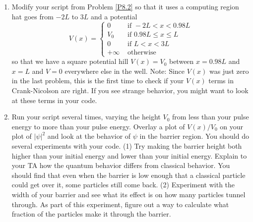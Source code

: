 \begin{problem}\label{P8.3}
\begin{enumerate}[label=(\alph*)]
	\item Modify your script from Problem \ref{P8.2} so that it uses a computing region hat goes from $-2L$ to $3L$ and a potential
\begin{equation}\label{eq:89}
V(x)= \begin{cases}0 & \text { if }-2 L<x<0.98 L \\ V_{0} & \text { if } 0.98 L \leq x \leq L \\ 0 & \text { if } L<x<3 L \\ +\infty & \text { otherwise }\end{cases}
\end{equation}
so that we have a square potential hill $V(x) = V_0$ between $x = 0.98L$ and $x = L$ and $V = 0$ everywhere else in the well.
Note: Since $V(x)$ was just zero in the last problem, this is the first time
to check if your $V(x)$ terms in Crank-Nicolson are right. If you see
strange behavior, you might want to look at these terms in your code.
\item Run your script several times, varying the height $V_0$ from less than your pulse energy to more than your pulse energy. Overlay a plot
of $V(x)/V_0$ on your plot of $ \vert \psi\vert^2$ and look at the behavior of $\psi$ in the barrier region. You should do several experiments with your code. (1) Try making
the barrier height both higher than your initial energy and lower than
your initial energy. Explain to your TA how the quantum behavior
differs from classical behavior. You should find that even when the
barrier is low enough that a classical particle could get over it, some
particles still come back. (2) Experiment with the width of your barrier
and see what its effect is on how many particles tunnel through. As
part of this experiment, figure out a way to calculate what fraction of
the particles make it through the barrier.

\end{enumerate}
\end{problem}